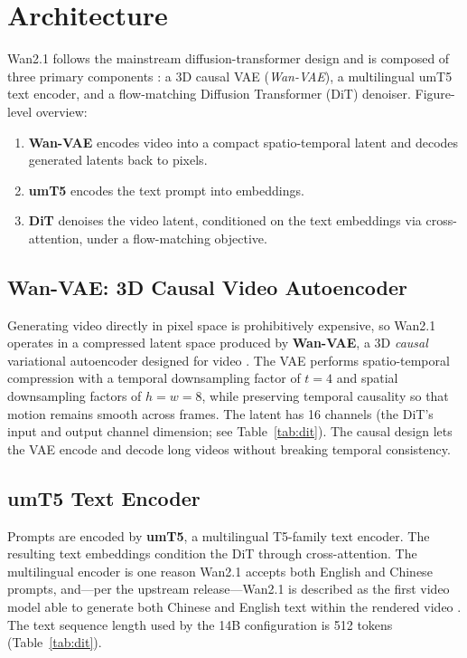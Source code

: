 \documentclass[11pt,a4paper]{article}
\begin{document}
\section{Architecture}

Wan2.1 follows the mainstream diffusion-transformer design and is composed of three primary
components \cite{wan2025report}: a 3D causal VAE (\emph{Wan-VAE}), a multilingual umT5 text encoder,
and a flow-matching Diffusion Transformer (DiT) denoiser. Figure-level overview:

\begin{enumerate}
    \item \textbf{Wan-VAE} encodes video into a compact spatio-temporal latent and decodes
    generated latents back to pixels.
    \item \textbf{umT5} encodes the text prompt into embeddings.
    \item \textbf{DiT} denoises the video latent, conditioned on the text embeddings via
    cross-attention, under a flow-matching objective.
\end{enumerate}

\subsection{Wan-VAE: 3D Causal Video Autoencoder}

Generating video directly in pixel space is prohibitively expensive, so Wan2.1 operates in a
compressed latent space produced by \textbf{Wan-VAE}, a 3D \emph{causal} variational autoencoder
designed for video \cite{wan2025report}. The VAE performs spatio-temporal compression with a
temporal downsampling factor of $t=4$ and spatial downsampling factors of $h=w=8$, while preserving
temporal causality so that motion remains smooth across frames. The latent has 16 channels (the
DiT's input and output channel dimension; see Table~\ref{tab:dit}). The causal design lets the VAE
encode and decode long videos without breaking temporal consistency.

\subsection{umT5 Text Encoder}

Prompts are encoded by \textbf{umT5}, a multilingual T5-family text encoder. The resulting text
embeddings condition the DiT through cross-attention. The multilingual encoder is one reason Wan2.1
accepts both English and Chinese prompts, and---per the upstream release---Wan2.1 is described as
the first video model able to generate both Chinese and English text within the rendered video
\cite{wan2025report}. The text sequence length used by the 14B configuration is 512 tokens
(Table~\ref{tab:dit}).
\end{document}
